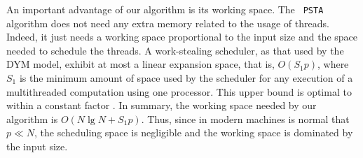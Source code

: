 An important advantage of our algorithm is its working space. The {\tt
PSTA} algorithm does not need any extra memory related to the usage of
threads. Indeed, it just needs a working space proportional to the
input size and the space needed to schedule the threads. A
work-stealing scheduler, as that used by the DYM model, exhibit at
most a linear expansion space, that is, $O(S_1p)$, where $S_1$ is the
minimum amount of space used by the scheduler for any execution of a
multithreaded computation using one processor. This upper bound is
optimal to within a constant factor
\cite{Blumofe:1999:SMC:324133.324234}. In summary, the working space
needed by our algorithm is $O(N\lg N+S_1p)$. Thus, since in modern
machines is normal that $p\ll N$, the scheduling space is negligible and the working space is dominated by the input size.


